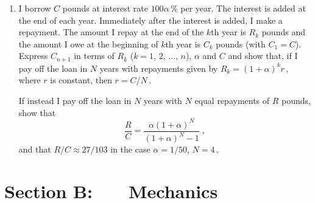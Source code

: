 \documentclass[a4, 11pt]{report}
\newlength{\qspace}
\newcounter{qnumber}
\newenvironment{question}%
 {\vspace{\qspace}
  \begin{enumerate}[\bfseries 1\quad][10]%
    \setcounter{enumi}{\value{qnumber}}%
    \item%
 }
{
  \end{enumerate}
  \filbreak
  \stepcounter{qnumber}
 }
\begin{document}
\begin{question}	
I borrow $C$ pounds at interest rate $100\alpha \,\%$ per year.
The interest is added at the end of each year. Immediately after the 
interest is added, I make 
a repayment. The amount I repay  at the end of the $k$th year is $R_k$
pounds and the amount I owe
at the beginning of   $k$th year is $C_k$ pounds (with $C_1=C$).
Express $C_{n+1}$ in terms of $R_k$ ($k= 1$, $2$, $\ldots$, $n$), $\alpha$ and $C$
and show that,  if I pay off the loan in $N$ years with repayments
given by $R_k= (1+\alpha)^kr\,$, where $r$ is constant, then $r=C/N\,$.



If instead I pay off the loan in  $N$ years with $N$ equal repayments
of $R$ pounds, show that 
\[
\frac R C = \frac{\alpha (1+\alpha)^{N} }{(1+\alpha)^N-1} \;,
\]
and that $R/C\approx 27/103$ in the case $\alpha =1/50$, $N=4\,$.
\end{question}	
		

		
	
\newpage
\section*{Section B: \ \ \ Mechanics}
\end{document}
